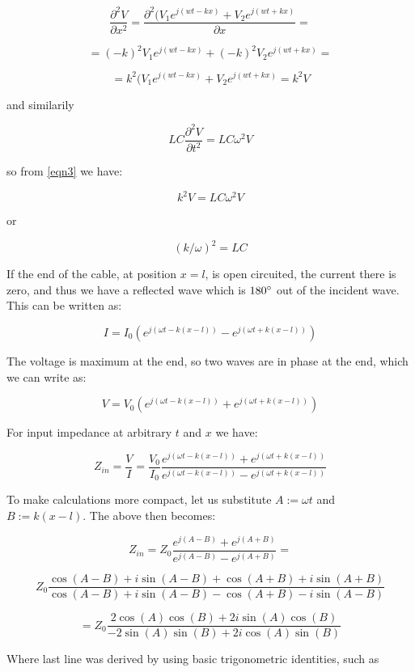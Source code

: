\documentclass[main.tex]{subfiles}
\begin{document}
$$ \frac{\partial ^2V}{\partial x^2} = \frac{\partial ^2(V_1e^{j(wt-kx)}+V_2e^{j(wt+kx)}}{\partial x} = $$

$$ = (-k)^2V_1e^{j(wt-kx)} + (-k)^2V_2e^{j(wt+kx)} = $$

$$ = k^2(V_1e^{j(wt-kx)} + V_2e^{j(wt+kx)} = k^2V $$

and similarily 

$$ LC\frac{\partial ^2V}{\partial t^2} = LC \omega ^2 V $$

so from \ref{eqn3} we have:

$$ k^2V = LC \omega ^2 V $$

or 

\begin{equation}
	(k/ \omega )^2 = LC
	\label{eqn7}
\end{equation}

If the end of the cable, at position $x = l$, is open circuited, the current there is zero, and thus we have a reflected wave which is $180 \degree $ out of the incident wave. This can be written as:

\begin{equation}
	I = I_0(e^{j(\omega t-k(x-l))} - e^{j(\omega t+k(x-l))})
	\label{eqn8}
\end{equation}

The voltage is maximum at the end, so two waves are in phase at the end, which we can write as:

\begin{equation}
	V = V_0(e^{j(\omega t-k(x-l))} + e^{j(\omega t+k(x-l))})
	\label{eqn9}
\end{equation}

For input impedance at arbitrary $t$ and $x$ we have:

$$ Z_{in} = \frac{V}{I} = \frac{V_0}{I_0} \frac{e^{j(\omega t-k(x-l))} + e^{j(\omega t+k(x-l))}}{e^{j(\omega t-k(x-l))} - e^{j(\omega t+k(x-l))}}$$

To make calculations more compact, let us substitute $A := \omega t$ and $B := k(x-l)$. The above then becomes:

$$ Z_{in} = Z_0 \frac{e^{j(A-B)}+e^{j(A+B)}}{e^{j(A-B)}-e^{j(A+B)}} = $$

$$Z_0 \frac{\cos(A-B) + i\sin(A-B) + \cos(A+B) + i\sin(A+B)}{\cos(A-B) + i\sin(A-B) - \cos(A+B) -i\sin(A-B)}$$

$$ = Z_0 \frac{2\cos(A)\cos(B) + 2i\sin(A)\cos(B)}{-2\sin(A)\sin(B)+2i\cos(A)\sin(B)}$$

Where last line was derived by using basic trigonometric identities, such as
\end{document}

